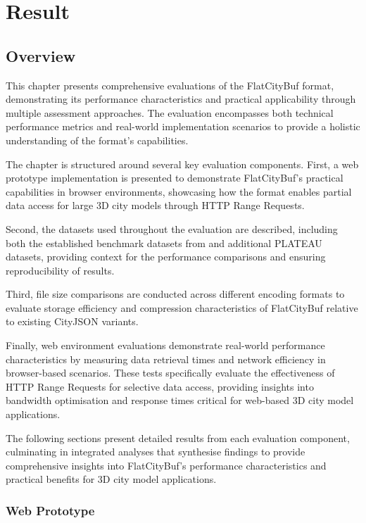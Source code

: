 \chapter{Result}
\label{chp:result}
\section{Overview}
\label{result:overview}
This chapter presents comprehensive evaluations of the FlatCityBuf format, demonstrating its performance characteristics and practical applicability through multiple assessment approaches. The evaluation encompasses both technical performance metrics and real-world implementation scenarios to provide a holistic understanding of the format's capabilities.

The chapter is structured around several key evaluation components. First, a web prototype implementation is presented to demonstrate FlatCityBuf's practical capabilities in browser environments, showcasing how the format enables partial data access for large 3D city models through HTTP Range Requests.

Second, the datasets used throughout the evaluation are described, including both the established benchmark datasets from \citet{ledoux_2024} and additional PLATEAU datasets, providing context for the performance comparisons and ensuring reproducibility of results.

Third, file size comparisons are conducted across different encoding formats to evaluate storage efficiency and compression characteristics of FlatCityBuf relative to existing CityJSON variants.

Finally, web environment evaluations demonstrate real-world performance characteristics by measuring data retrieval times and network efficiency in browser-based scenarios. These tests specifically evaluate the effectiveness of HTTP Range Requests for selective data access, providing insights into bandwidth optimisation and response times critical for web-based 3D city model applications.

The following sections present detailed results from each evaluation component, culminating in integrated analyses that synthesise findings to provide comprehensive insights into FlatCityBuf's performance characteristics and practical benefits for 3D city model applications.

\subsection{Web Prototype}
\label{result:web_prototype}

